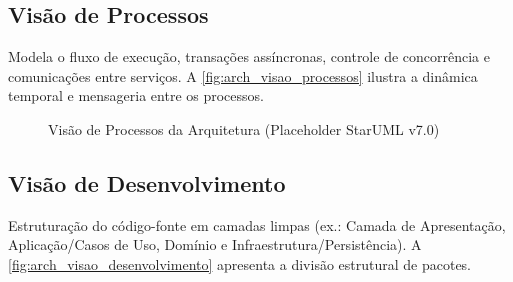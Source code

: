 \subsection{Visão de Processos}
Modela o fluxo de execução, transações assíncronas, controle de concorrência e comunicações entre serviços. A \autoref{fig:arch_visao_processos} ilustra a dinâmica temporal e mensageria entre os processos.

\begin{figure}[htbp]
    \centering
    \caption{Visão de Processos da Arquitetura (Placeholder StarUML v7.0)}
    \label{fig:arch_visao_processos}
\end{figure}

\subsection{Visão de Desenvolvimento}
Estruturação do código-fonte em camadas limpas (ex.: Camada de Apresentação, Aplicação/Casos de Uso, Domínio e Infraestrutura/Persistência). A \autoref{fig:arch_visao_desenvolvimento} apresenta a divisão estrutural de pacotes.

